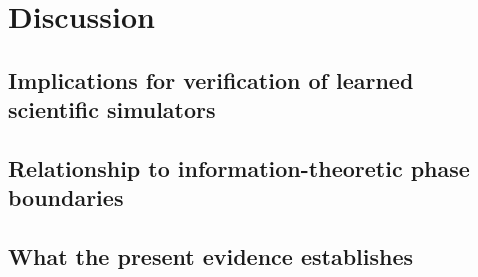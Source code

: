 \section{Discussion}

\subsection{Implications for verification of learned scientific simulators}

\draftplaceholder

\subsection{Relationship to information-theoretic phase boundaries}

\draftplaceholder

\subsection{What the present evidence establishes}

\draftplaceholder
